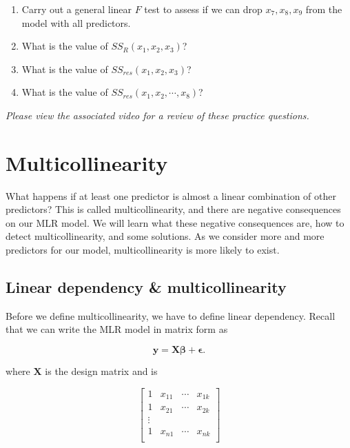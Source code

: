 \documentclass[
]{book}
\providecommand{\tightlist}{%
  \setlength{\itemsep}{0pt}\setlength{\parskip}{0pt}}
\begin{document}
\begin{enumerate}
\def\labelenumi{\arabic{enumi}.}
\tightlist
\item
  Carry out a general linear \(F\) test to assess if we can drop \(x_7, x_8, x_9\) from the model with all predictors.
\item
  What is the value of \(SS_R(x_1, x_2, x_3)\)?
\item
  What is the value of \(SS_{res}(x_1, x_2, x_3)\)?
\item
  What is the value of \(SS_{res}(x_1, x_2, \cdots, x_8)\)?
\end{enumerate}

\emph{Please view the associated video for a review of these practice questions.}

\hypertarget{multicollinearity}{%
\section{Multicollinearity}\label{multicollinearity}}

What happens if at least one predictor is almost a linear combination of other predictors? This is called multicollinearity, and there are negative consequences on our MLR model. We will learn what these negative consequences are, how to detect multicollinearity, and some solutions. As we consider more and more predictors for our model, multicollinearity is more likely to exist.

\hypertarget{linear-dependency-multicollinearity}{%
\subsection{Linear dependency \& multicollinearity}\label{linear-dependency-multicollinearity}}

Before we define multicollinearity, we have to define linear dependency. Recall that we can write the MLR model in matrix form as

\begin{equation} 
\boldsymbol{y} = \boldsymbol{X \beta} + \boldsymbol{\epsilon}.
\label{eq:7matrix}
\end{equation}

where \(\boldsymbol{X}\) is the design matrix and is

\[
\left[
\begin{array}{cccc}
   1 & x_{11} & \cdots & x_{1k}  \\
   1 & x_{21} & \cdots & x_{2k}  \\
   \vdots   \\
   1 & x_{n1} & \cdots & x_{nk}  \\
\end{array}
\right]
\]
\end{document}
